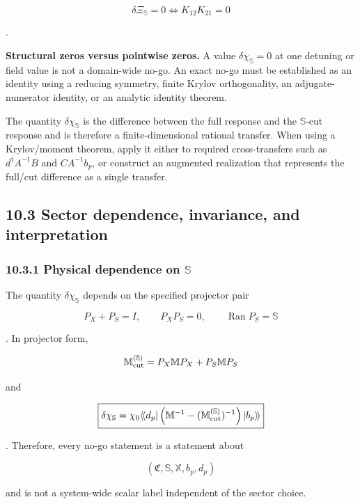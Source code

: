 \documentclass[
  10pt,
  a4paper,
]{article}
\begin{document}
\[
\boxed{
\delta\Xi_{\mathbb S}=0
\Longleftrightarrow
K_{12}K_{21}=0
}
\]

.

\textbf{Structural zeros versus pointwise zeros.} A value
\(\delta\chi_{\mathbb S}=0\) at one detuning or field value is not a
domain-wide no-go. An exact no-go must be established as an identity
using a reducing symmetry, finite Krylov orthogonality, an
adjugate-numerator identity, or an analytic identity theorem.

The quantity \(\delta\chi_{\mathbb S}\) is the difference between the
full response and the \(\mathbb S\)-cut response and is therefore a
finite-dimensional rational transfer. When using a Krylov/moment
theorem, apply it either to required cross-transfers such as
\(d^\dagger A^{-1}B\) and \(CA^{-1}b_p\), or construct an augmented
realization that represents the full/cut difference as a single
transfer.

\subsection{10.3 Sector dependence, invariance, and
interpretation}\label{sector-dependence-invariance-and-interpretation}

\subsubsection{\texorpdfstring{10.3.1 Physical dependence on
\(\mathbb S\)}{10.3.1 Physical dependence on \textbackslash mathbb S}}\label{physical-dependence-on-mathbb-s}

The quantity \(\delta\chi_{\mathbb S}\) depends on the specified
projector pair

\[
P_X+P_S=I,
\qquad
P_XP_S=0,
\qquad
\operatorname{Ran}P_S=\mathbb S
\]

. In projector form,

\[
\mathbb M_{\rm cut}^{(\mathbb S)}
=P_X\mathbb MP_X+P_S\mathbb MP_S
\]

and

\[
\boxed{
\delta\chi_{\mathbb S}
=\chi_0\langle\!\langle d_p|
\left(\mathbb M^{-1}-(\mathbb M_{\rm cut}^{(\mathbb S)})^{-1}\right)
|b_p\rangle\!\rangle
}
\]

. Therefore, every no-go statement is a statement about

\[
(\mathfrak C,\mathbb S,\mathbb X,b_p,d_p)
\]

and is not a system-wide scalar label independent of the sector choice.
\end{document}
